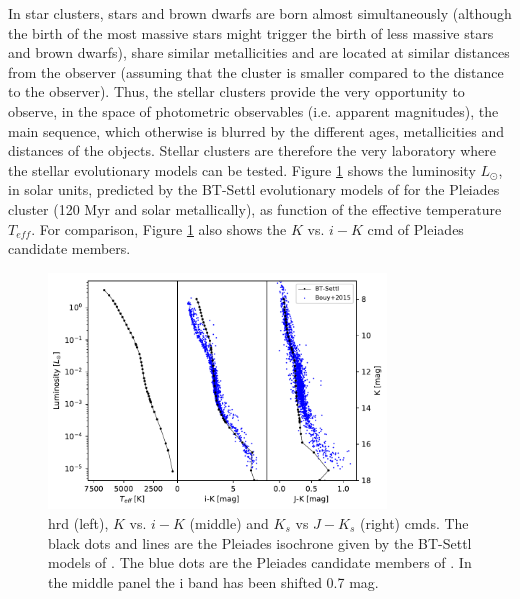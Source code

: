 In star clusters, stars and brown dwarfs are born almost simultaneously (although the birth of the most massive stars might trigger the birth of less massive stars and brown dwarfs), share similar metallicities and are located at similar distances from the observer (assuming that the cluster is smaller compared to the distance to the observer). Thus, the stellar clusters provide the very opportunity to observe, in the space of photometric observables (i.e. apparent magnitudes), the main sequence, which otherwise is blurred by the different ages, metallicities and distances of the objects. Stellar clusters are therefore the very laboratory where the stellar evolutionary models can be tested. Figure \ref{fig:HDRvsCMD} shows the luminosity $L_{\odot}$, in solar units, predicted by the BT-Settl evolutionary models of \citep{2014IAUS..299..271A} for the Pleiades cluster (120 Myr and solar metallically), as function of the effective temperature $T_{eff}$. For comparison, Figure \ref{fig:HDRvsCMD} also shows the $K$ vs. $i-K$ \gls{cmd} of \citet{Bouy2015} Pleiades candidate members. 

\begin{figure}[htp!]
\begin{center}
\includegraphics[page=1,width=0.8\textwidth]{background/Figures/BT-Settl-2011bc-120Myr_Teff_vs_phot.pdf}
\caption{\gls{hrd} (left), $K$ vs. $i-K$ (middle) and $K_s$ vs $J-K_s$ (right) \glspl{cmd}. The black dots and lines are the Pleiades isochrone given by the BT-Settl models of \citep{2014IAUS..299..271A}. The blue dots are the Pleiades candidate members of \citet{Bouy2015}. In the middle panel the i band has been shifted 0.7 mag.}
\label{fig:HDRvsCMD}
\end{center}
\end{figure}

